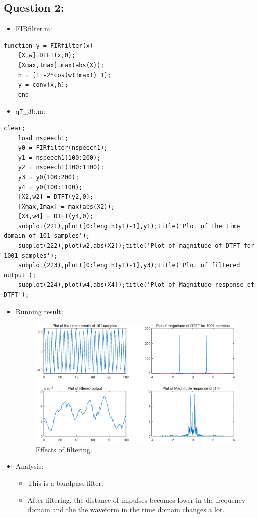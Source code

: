 \documentclass[onecolumn,oneside]{SUSTechHomework}
\begin{document}
\subsection*{Question 2:}
\begin{itemize}
	\item FIRfilter.m:
\end{itemize}
\begin{lstlisting}[title=FIRfilter.m]
	function y = FIRfilter(x)
	[X,w]=DTFT(x,0);
	[Xmax,Imax]=max(abs(X));
	h = [1 -2*cos(w(Imax)) 1];
	y = conv(x,h);
	end
\end{lstlisting}
\begin{itemize}
	\item q7\_3b.m:
\end{itemize}
\begin{lstlisting}[title=q7\_3b.m]
	clear;
	load nspeech1;
	y0 = FIRfilter(nspeech1);
	y1 = nspeech1(100:200);
	y2 = nspeech1(100:1100);
	y3 = y0(100:200);
	y4 = y0(100:1100);
	[X2,w2] = DTFT(y2,0);
	[Xmax,Imax] = max(abs(X2));
	[X4,w4] = DTFT(y4,0);
	subplot(221),plot([0:length(y1)-1],y1);title('Plot of the time domain of 101 samples');
	subplot(222),plot(w2,abs(X2));title('Plot of magnitude of DTFT for 1001 samples');
	subplot(223),plot([0:length(y1)-1],y3);title('Plot of filtered output');
	subplot(224),plot(w4,abs(X4));title('Plot of Magnitude response of DTFT');	
\end{lstlisting}
\begin{itemize}
	\item Running result:
	\begin{figure}[H]
		\centering
		\includegraphics[width=170mm]{pictures/FIRfilter.eps}
		\caption{Effects of filtering.}
	\end{figure}
	\item Analysis:
	\begin{itemize}
		\item This is a bandpass filter.
		\item After filtering, the distance of impulses becomes lower in the frequency domain and the the waveform in the time domain changes a lot.
	\end{itemize}	
\end{itemize}
\end{document}
